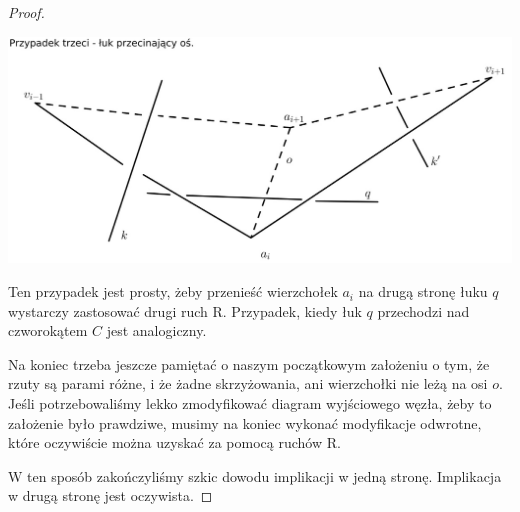 \begin{proof}
	\begin{center}

	\includegraphics[scale=0.5]{1/pictures/axis.jpg}
	\end{center}

	
Ten przypadek jest prosty, żeby przenieść wierzchołek $a_i$ na drugą stronę łuku $q$ wystarczy zastosować drugi ruch R. Przypadek, kiedy łuk $q$ przechodzi nad czworokątem $C$ jest analogiczny.

Na koniec trzeba jeszcze pamiętać o naszym początkowym założeniu o tym, że rzuty są parami różne, i że żadne skrzyżowania, ani wierzchołki nie leżą na osi $o$. Jeśli potrzebowaliśmy
lekko zmodyfikować diagram wyjściowego węzła, żeby to założenie było prawdziwe, musimy na koniec wykonać modyfikacje odwrotne, które oczywiście można uzyskać za pomocą ruchów R.

W ten sposób zakończyliśmy szkic dowodu implikacji w jedną stronę. Implikacja w drugą stronę jest oczywista. 
	
\end{proof}